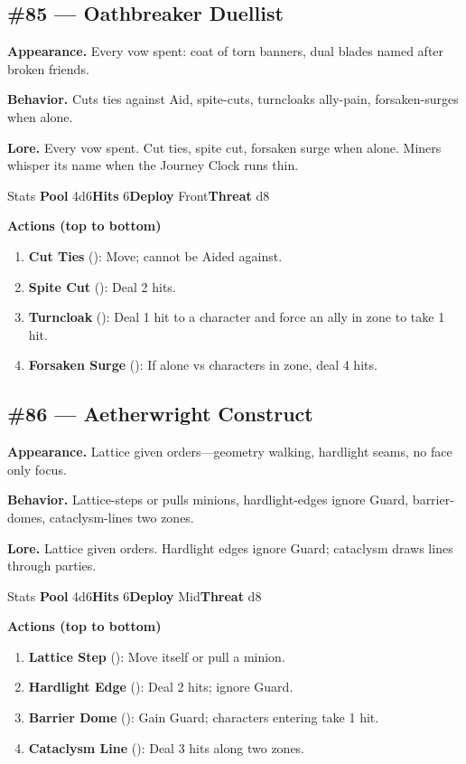 \subsection*{\#85 --- Oathbreaker Duellist}

\textbf{Appearance.} Every vow spent: coat of torn banners, dual blades named after broken friends.

\textbf{Behavior.} Cuts ties against Aid, spite-cuts, turncloaks ally-pain, forsaken-surges when alone.

\textbf{Lore.} Every vow spent. Cut ties, spite cut, forsaken surge when alone. Miners whisper its name when the Journey Clock runs thin.

\begin{monsterentry}{Stats}
\textbf{Pool} 4d6\quad\textbf{Hits} 6\quad\textbf{Deploy} Front\quad\textbf{Threat} d8

\textbf{Actions (top to bottom)}
\begin{enumerate}\setlength{\itemsep}{0.15em}\setlength{\parskip}{0pt}
  \item \textbf{Cut Ties} (\easy): Move; cannot be Aided against.
  \item \textbf{Spite Cut} (\medium): Deal 2 hits.
  \item \textbf{Turncloak} (\hard): Deal 1 hit to a character and force an ally in zone to take 1 hit.
  \item \textbf{Forsaken Surge} (\hard): If alone vs characters in zone, deal 4 hits.
\end{enumerate}
\end{monsterentry}

\subsection*{\#86 --- Aetherwright Construct}

\textbf{Appearance.} Lattice given orders---geometry walking, hardlight seams, no face only focus.

\textbf{Behavior.} Lattice-steps or pulls minions, hardlight-edges ignore Guard, barrier-domes, cataclysm-lines two zones.

\textbf{Lore.} Lattice given orders. Hardlight edges ignore Guard; cataclysm draws lines through parties.

\begin{monsterentry}{Stats}
\textbf{Pool} 4d6\quad\textbf{Hits} 6\quad\textbf{Deploy} Mid\quad\textbf{Threat} d8

\textbf{Actions (top to bottom)}
\begin{enumerate}\setlength{\itemsep}{0.15em}\setlength{\parskip}{0pt}
  \item \textbf{Lattice Step} (\easy): Move itself or pull a minion.
  \item \textbf{Hardlight Edge} (\medium): Deal 2 hits; ignore Guard.
  \item \textbf{Barrier Dome} (\hard): Gain Guard; characters entering take 1 hit.
  \item \textbf{Cataclysm Line} (\hard): Deal 3 hits along two zones.
\end{enumerate}
\end{monsterentry}

